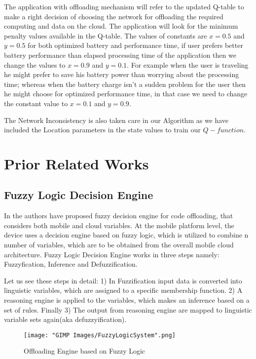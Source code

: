 \documentclass[12pt, twocolumn]{report}
\begin{document}
The application with offloading mechanism will refer to the updated Q-table to make a right decision of choosing the network
for offloading the required computing and data on the cloud. The application will look for the minimum penalty values available in the Q-table. The values of constants are $ x = 0.5 $ and $ y = 0.5 $ for both optimized battery and performance time, if user prefers better battery performance than elapsed processing time of the application then we change the values to $ x = 0.9 $ and $ y = 0.1 $. For example when the user is traveling he might prefer to save his battery power than worrying about the processing time; whereas when the battery charge isn't a sudden problem for the user then he might choose for optimized performance time, in that case we need to change the constant value to $x = 0.1$ and $y = 0.9$.

The Network Inconsistency is also taken care in our Algorithm as we have included the Location parameters in the state values to train our $Q-function$.


\chapter{Prior Related Works}
\section{Fuzzy Logic Decision Engine}

In \cite{flores2013adaptive} the authors have proposed fuzzy decision engine for code offloading, that considers both mobile and cloud variables. At the mobile platform level, the device uses a decision engine based on fuzzy logic, which is utilized to
combine n number of variables, which are to be obtained from the overall mobile cloud architecture. Fuzzy
Logic Decision Engine works in three steps namely: Fuzzyfication, Inference and Defuzzification. 

Let us see these steps in detail:
1) In Fuzzification input data is converted into linguistic variables, which are assigned to a specific
membership function. 2) A reasoning engine is applied to the variables, which makes an inference based on
a set of rules. Finally 3) The output from reasoning engine are mapped to linguistic variable sets again(aka
defuzzyification).
\begin{figure}[h]
  \centering
  \texttt{[image: "GIMP Images/FuzzyLogicSystem".png]}
  \caption{Offloading Engine based on Fuzzy Logic}
  \label{fig:FuzzyLogicSystem}
\end{figure}
\end{document}
